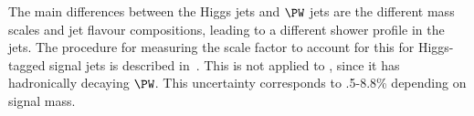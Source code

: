 \begin{itemize}
The main differences between the Higgs jets and $\PW$ jets are the different mass scales and jet flavour compositions, leading to a different shower profile in the jets. The procedure for measuring the scale factor to account for this for Higgs-tagged signal jets is described in~\cite{CMS-PAS-B2G-16-026}.
This is not applied to \ttbar, since it has hadronically decaying $\PW$. This uncertainty corresponds to .5-8.8\% depending on signal mass.



\end{itemize}
